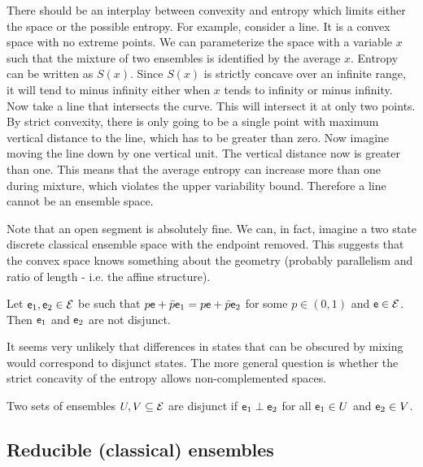 \begin{remark}
	There should be an interplay between convexity and entropy which limits either the space or the possible entropy. For example, consider a line. It is a convex space with no extreme points. We can parameterize the space with a variable $x$ such that the mixture of two ensembles is identified by the average $x$. Entropy can be written as $S(x)$. Since $S(x)$ is strictly concave over an infinite range, it will tend to minus infinity either when $x$ tends to infinity or minus infinity. Now take a line that intersects the curve. This will intersect it at only two points. By strict convexity, there is only going to be a single point with maximum vertical distance to the line, which has to be greater than zero. Now imagine moving the line down by one vertical unit. The vertical distance now is greater than one. This means that the average entropy can increase more than one during mixture, which violates the upper variability bound. Therefore a line cannot be an ensemble space.
	
	Note that an open segment is absolutely fine. We can, in fact, imagine a two state discrete classical ensemble space with the endpoint removed. This suggests that the convex space knows something about the geometry (probably parallelism and ratio of length - i.e. the affine structure).
\end{remark}

\begin{conj}
	Let $\mathsf{e}_1, \mathsf{e}_2 \in \mathcal{E}$ be such that $p\mathsf{e} + \bar{p} \mathsf{e}_1 = p\mathsf{e} + \bar{p} \mathsf{e}_2$ for some $p \in (0, 1)$ and $\mathsf{e} \in \mathcal{E}$. Then $\mathsf{e}_1$ and $\mathsf{e}_2$ are not disjunct.
\end{conj}

\begin{remark}
	It seems very unlikely that differences in states that can be obscured by mixing would correspond to disjunct states. The more general question is whether the strict concavity of the entropy allows non-complemented spaces.
\end{remark}

\begin{defn}
	Two sets of ensembles $U, V \subseteq \mathcal{E}$ are disjunct if $\mathsf{e}_1 \perp \mathsf{e}_2$ for all $\mathsf{e}_1 \in U$ and $\mathsf{e}_2 \in V$. 
\end{defn}

\subsection{Reducible (classical) ensembles}


